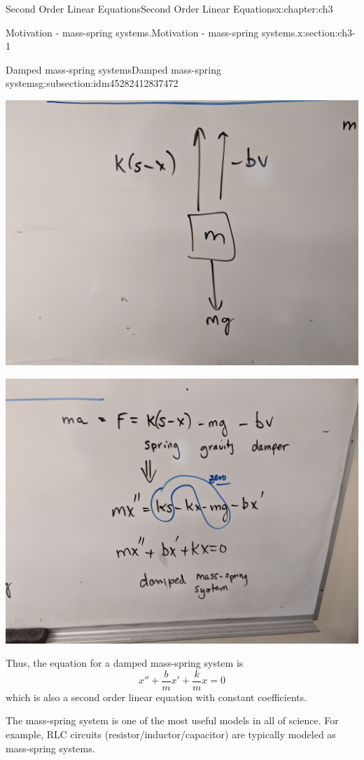 \documentclass[oneside,10pt,]{book}
\numberwithin{equation}{section}
\numberwithin{equation}{section}
\begin{document}
\begin{chapterptx}{Second Order Linear Equations}{}{Second Order Linear Equations}{}{}{x:chapter:ch3}
\begin{sectionptx}{Motivation - mass-spring systems.}{}{Motivation - mass-spring systems.}{}{}{x:section:ch3-1}
\begin{subsectionptx}{Damped mass-spring systems}{}{Damped mass-spring systems}{}{}{g:subsection:idm45282412837472}
\begin{image}{0}{1}{0}
\end{image}%
\begin{image}{0}{1}{0}%
\includegraphics[width=\linewidth]{images/damped2.jpg}
\end{image}%
\begin{image}{0}{1}{0}%
\includegraphics[width=\linewidth]{images/damped3.jpg}
\end{image}%
Thus, the equation for a damped mass-spring system is%
\begin{equation*}
x'' + \frac{b}{m} x' + \frac{k}{m} x = 0
\end{equation*}
which is also a second order linear equation with constant coefficients.%
\par
The mass-spring system is one of the most useful models in all of science. For example, RLC circuits (resistor\slash{}inductor\slash{}capacitor) are typically modeled as mass-spring systems.%

\end{subsectionptx}
\end{sectionptx}
\end{chapterptx}
\end{document}
